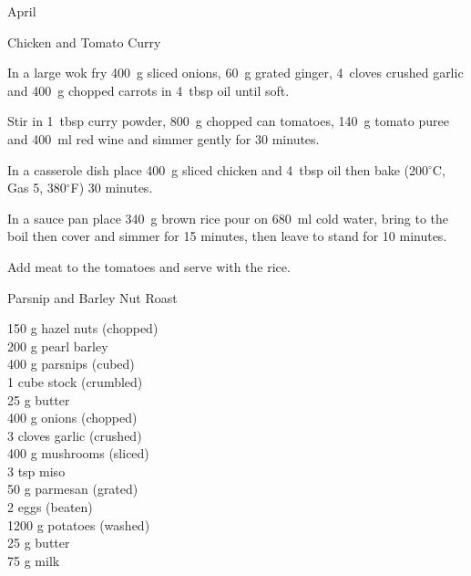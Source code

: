 \begin{menu}{April}
\begin{recipe}{2}{Chicken and Tomato Curry}
	
	
    \begin{instructions}
    \item 
        In a large wok fry
        400~g sliced onions,
        60~g grated ginger,
        4~cloves crushed garlic
        and
        400~g chopped carrots
        in
        4~tbsp  oil
        until soft.
      \item 
        Stir in
        1~tbsp  curry powder,
        800~g chopped can tomatoes,
        140~g  tomato puree
        and
        400~ml  red wine
        and simmer gently for 30 minutes.
      \item 
        In a casserole dish place
        400~g sliced chicken
        and
        4~tbsp  oil
        then bake (200$^{\circ}$C, Gas 5, 380$^{\circ}$F) 30 minutes.
      \item 
    In a
    sauce pan
    place
    340~g  brown rice
    pour on
    680~ml  cold water,
    bring to the boil then cover and simmer for 15 minutes,
    then leave to stand for 10 minutes.
  \item 
        Add meat to the tomatoes and serve with the rice.
      
    \end{instructions}
    \end{recipe}%
  
    \begin{recipe}{2}{Parsnip and Barley Nut Roast}%
		\begin{ingredients}
		150 g hazel nuts (chopped) \\
	200 g pearl barley  \\
	400 g parsnips (cubed) \\
	1 cube stock (crumbled) \\
	25 g butter  \\
	400 g onions (chopped) \\
	3 cloves garlic (crushed) \\
	400 g mushrooms (sliced) \\
	3 tsp miso  \\
	50 g parmesan (grated) \\
	2  eggs (beaten) \\
	1200 g potatoes (washed) \\
	25 g butter  \\
	75 g milk  \\
	

\end{ingredients}
\end{recipe}
\end{menu}
